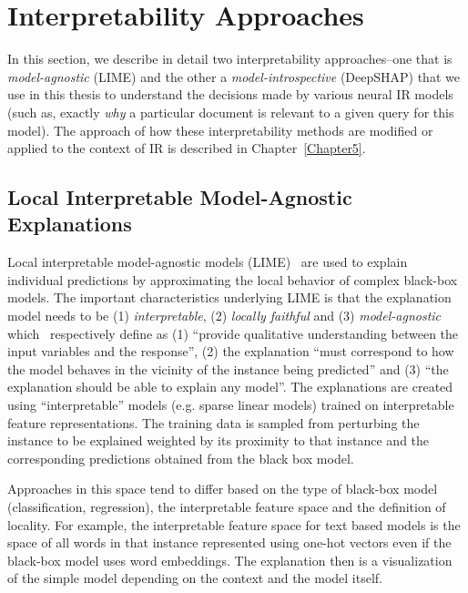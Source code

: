 \section{Interpretability Approaches}
In this section, we describe in detail two interpretability approaches--one that is \textit{model-agnostic} (LIME) and the other a \textit{model-introspective} (DeepSHAP) that we use in this thesis to understand the decisions made by various neural IR models (such as, exactly \textit{why} a particular document is relevant to a given query for this model). The approach of how these interpretability methods are modified or applied to the context of IR is described in Chapter~\ref{Chapter5}.

\subsection{Local Interpretable Model-Agnostic Explanations}\label{sec:lime_approach}

Local interpretable model-agnostic models (LIME)~\citep{Ribeiro16, Ribeiro18} are used to explain individual predictions by approximating the local behavior of complex black-box models. The important characteristics underlying LIME is that the explanation model needs to be (1) \textit{interpretable}, (2) \textit{locally faithful} and (3) \textit{model-agnostic} which~\cite{Ribeiro16} respectively define as (1) ``provide qualitative understanding between the input variables and the response'', (2) the explanation ``must correspond to how the model behaves in the vicinity of the instance being predicted'' and (3) ``the explanation should
be able to explain any model''. The explanations are created using ``interpretable'' models (e.g. sparse linear models) trained on interpretable feature representations. The training data is sampled from perturbing the instance to be explained weighted by its proximity to that instance and the corresponding predictions obtained from the black box model.

Approaches in this space tend to differ based on the type of black-box model (classification, regression), the interpretable feature space and the definition of locality. For example, the interpretable feature space for text based models is the space of all words in that instance represented using one-hot vectors even if the black-box model uses word embeddings. The explanation then is a visualization of the simple model depending on the context and the model itself.

